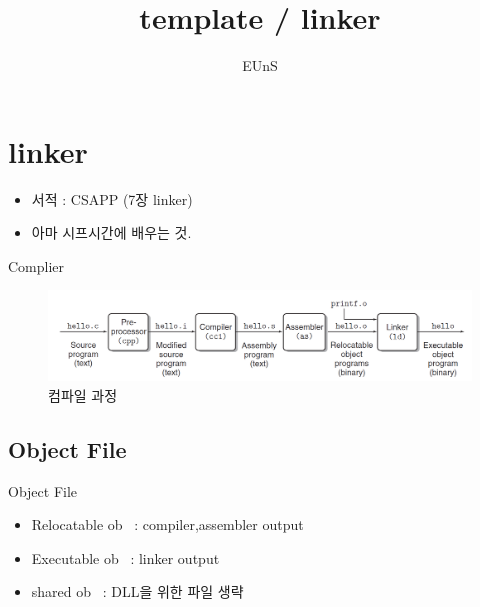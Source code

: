 \documentclass[10pt]{beamer}
\title{template / linker}
\author{EUnS}
\begin{document}

\begin{frame}{}
    \maketitle
\end{frame}    

\begin{frame}{}
    \tableofcontents
\end{frame}   

\section{linker}

\begin{frame}
    \begin{itemize}
        \item 서적 : CSAPP (7장 linker)
        \item 아마 시프시간에 배우는 것.
    \end{itemize}
\end{frame}

\begin{frame}{Complier}
    \begin{figure}[h!]
        \centering
        \includegraphics[scale=0.25]{pic1}
        \caption{컴파일 과정}
    \end{figure}
\end{frame}    

\subsection{Object File}
\begin{frame}{Object File}
    
    \begin{itemize}
        \item Relocatable ob~ : compiler,assembler output
        \item Executable ob~ : linker output
        \item shared ob~ : DLL을 위한 파일 생략
    \end{itemize}
\end{frame}    
\end{document}
